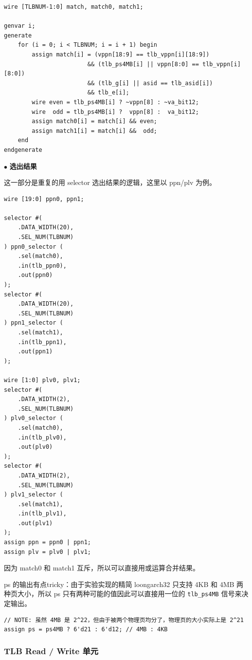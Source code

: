 \begin{lstlisting}
wire [TLBNUM-1:0] match, match0, match1;

genvar i;
generate
    for (i = 0; i < TLBNUM; i = i + 1) begin
        assign match[i] = (vppn[18:9] == tlb_vppn[i][18:9])
                        && (tlb_ps4MB[i] || vppn[8:0] == tlb_vppn[i][8:0])
                        && (tlb_g[i] || asid == tlb_asid[i])
                        && tlb_e[i];
        wire even = tlb_ps4MB[i] ? ~vppn[8] : ~va_bit12;
        wire  odd = tlb_ps4MB[i] ?  vppn[8] :  va_bit12;
        assign match0[i] = match[i] && even;
        assign match1[i] = match[i] &&  odd;
    end
endgenerate
\end{lstlisting}

\noindent
$\bullet$
\textbf{选出结果}

这一部分是重复的用 selector 选出结果的逻辑，这里以 ppn/plv 为例。

\begin{lstlisting}
wire [19:0] ppn0, ppn1;

selector #(
    .DATA_WIDTH(20),
    .SEL_NUM(TLBNUM)
) ppn0_selector (
    .sel(match0),
    .in(tlb_ppn0),
    .out(ppn0)
);
selector #(
    .DATA_WIDTH(20),
    .SEL_NUM(TLBNUM)
) ppn1_selector (
    .sel(match1),
    .in(tlb_ppn1),
    .out(ppn1)
);

wire [1:0] plv0, plv1;
selector #(
    .DATA_WIDTH(2),
    .SEL_NUM(TLBNUM)
) plv0_selector (
    .sel(match0),
    .in(tlb_plv0),
    .out(plv0)
);
selector #(
    .DATA_WIDTH(2),
    .SEL_NUM(TLBNUM)
) plv1_selector (
    .sel(match1),
    .in(tlb_plv1),
    .out(plv1)
);
assign ppn = ppn0 | ppn1;
assign plv = plv0 | plv1;
\end{lstlisting}

因为 match0 和 match1 互斥，所以可以直接用或运算合并结果。

\vspace{1em}

ps 的输出有点tricky：由于实验实现的精简 loongarch32 只支持 4KB 和 4MB 两种页大小，所以 ps 只有两种可能的值因此可以直接用一位的 \verb|tlb_ps4MB| 信号来决定输出。

\begin{lstlisting}
// NOTE: 虽然 4MB 是 2^22，但由于被两个物理页均分了，物理页的大小实际上是 2^21
assign ps = ps4MB ? 6'd21 : 6'd12; // 4MB : 4KB
\end{lstlisting}

\subsubsection{TLB Read / Write 单元}

